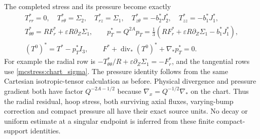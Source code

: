 The completed stress and its pressure become exactly
\begin{equation}\label{mcstress:chart_tensor}
\begin{gathered}
 T^*_{rr}=0,\quad T^*_{r\theta}=\Sigma_2,\quad
 T^*_{rz}=\Sigma_1,\quad T^*_{z\theta}=-b_2^*J_2^*,\quad
 T^*_{zz}=-b_1^*J_1^*,\\
 T^*_{\theta\theta}=RF_r^*+\varepsilon R\partial_Z\Sigma_1,
 \qquad
 p_T^*=Q^{2A}p_T
  =\tfrac13(RF_r^*+\varepsilon R\partial_Z\Sigma_1-b_1^*J_1^*),\\
 (T^0)^*=T^*-p_T^*I_3,\qquad
 F^*+\operatorname{div}_*(T^0)^*+\nabla_*p_T^*=0.
\end{gathered}
\end{equation}
For example the radial row is
$-T^*_{\theta\theta}/R+\varepsilon\partial_Z\Sigma_1=-F_r^*$,
and the tangential rows use \eqref{mcstress:chart_sigma}. The pressure
identity follows from the same Cartesian isotropic-tensor calculation
as before. Physical divergence and pressure gradient both have factor
$Q^{-2A-1/2}$ because $\nabla_x=Q^{-1/2}\nabla_*$ on the chart.
Thus the radial residual, hoop stress, both surviving axial fluxes,
varying-bump correction and compact pressure all have their exact
source units. No decay or uniform estimate at a singular endpoint is
inferred from these finite compact-support identities.
